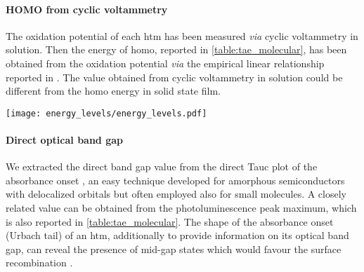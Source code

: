 \paragraph{HOMO from cyclic voltammetry}
The oxidation potential of each \gls{htm} has been measured \textsl{via} cyclic voltammetry in solution.
Then the energy of \gls{homo}, reported in \cref{table:tae_molecular}, has been obtained from the oxidation potential \textsl{via} the empirical linear relationship reported in .
The value obtained from cyclic voltammetry in solution could be different from the \gls{homo} energy in solid state film.

\begin{SCfigure}
	\centering
	\texttt{[image: energy\_levels/energy\_levels.pdf]}
	\label{fig:tae-energy_levels}
\end{SCfigure}

\paragraph{Direct optical band gap}
We extracted the direct band gap value from the direct Tauc plot of the absorbance onset \cite{WikipediaTauc}, an easy technique developed for amorphous semiconductors \cite{Stenzel2005} with delocalized orbitals but often employed also for small molecules.
A closely related value can be obtained from the photoluminescence peak maximum, which is also reported in \cref{table:tae_molecular}.
The shape of the absorbance onset (Urbach tail) of an \gls{htm}, additionally to provide information on its optical band gap, can reveal the presence of mid-gap states which would favour the surface recombination \cite{Tvingstedt2017}.

